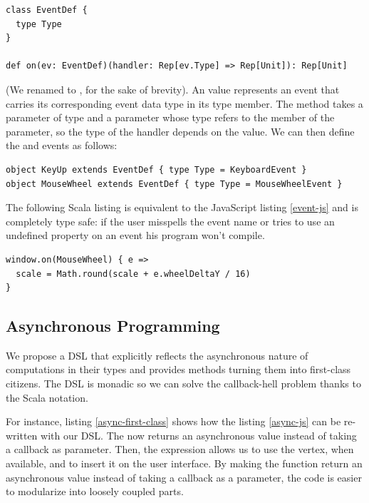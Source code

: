 \documentclass[american,english,runningheads]{llncs}
\begin{document}
\begin{lstlisting}
class EventDef {
  type Type
}

def on(ev: EventDef)(handler: Rep[ev.Type] => Rep[Unit]): Rep[Unit]
\end{lstlisting}

(We renamed  to , for the sake of brevity). An  value represents an
event that carries its corresponding event data type in its  type member. The  method takes a
parameter  of type  and a  parameter whose type refers to the 
member of the  parameter, so the type of the handler depends on the  value. We can then define the
 and  events as follows:

\begin{lstlisting}
object KeyUp extends EventDef { type Type = KeyboardEvent }
object MouseWheel extends EventDef { type Type = MouseWheelEvent }
\end{lstlisting}

The following Scala listing is equivalent to the JavaScript listing \ref{event-js} and is completely type safe: if
the user misspells the event name or tries to use an undefined property on an event his program won’t compile.

\begin{lstlisting}
window.on(MouseWheel) { e =>
  scale = Math.round(scale + e.wheelDeltaY / 16)
}
\end{lstlisting}

\subsection{Asynchronous Programming}

We propose a DSL that explicitly reflects the asynchronous nature of computations in their types and provides methods
turning them into first-class citizens. The DSL is monadic so we can solve the callback-hell problem thanks to the
Scala  notation.

For instance, listing \ref{async-first-class} shows how the listing \ref{async-js} can be
re-written with our DSL. The  now returns an asynchronous value instead of taking a callback as
parameter. Then, the  expression allows us to use the vertex, when available, and to insert it on the user
interface. By making the  function return an asynchronous value instead of taking a callback as
a parameter, the code is easier to modularize into loosely coupled parts.
\end{document}
